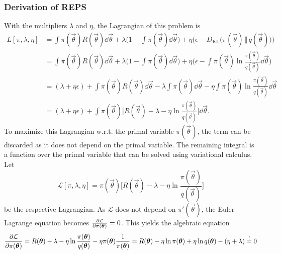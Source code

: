 			\subsubsection{Derivation of REPS}
				With the multipliers \( \lambda \) and \( \eta \), the Lagrangian of this problem is
				\begin{align}
					L[\pi, \lambda, \eta] & =
					\int\! \pi(\vec{\theta}) R(\vec{\theta}) \dd{\vec{\theta}}
					+ \lambda \bigg(\! 1 - \int\! \pi(\vec{\theta}) \dd{\vec{\theta}} \!\!\bigg)
					+ \eta \big( \epsilon - D_\mathrm{KL}\big( \pi(\vec{\theta}) \,\Vert\, q(\vec{\theta}) \big) \big)  \nonumber                             \\
					                      & =
					\int\! \pi(\vec{\theta}) R(\vec{\theta}) \dd{\vec{\theta}}
					+ \lambda \bigg(\! 1 - \int\! \pi(\vec{\theta}) \dd{\vec{\theta}} \!\!\bigg)
					+ \eta \bigg(\! \epsilon - \int\! \pi(\vec{\theta}) \ln \frac{\pi(\vec{\theta})}{q(\vec{\theta})} \dd{\vec{\theta}} \!\!\bigg)  \nonumber \\
					                      & = (\lambda + \eta \epsilon)
					+ \int\! \pi(\vec{\theta}) R(\vec{\theta}) \dd{\vec{\theta}}
					- \lambda \int\! \pi(\vec{\theta}) \dd{\vec{\theta}}
					- \eta \int\! \pi(\vec{\theta}) \ln \frac{\pi(\vec{\theta})}{q(\vec{\theta})} \dd{\vec{\theta}}  \label{eq:repsLagrangian}                \\
					                      & = (\lambda + \eta\epsilon)
					+ \int\! \pi(\vec{\theta}) \bigg[ R(\vec{\theta}) - \lambda - \eta \ln \frac{\pi(\vec{\theta})}{q(\vec{\theta})} \bigg] \dd{\vec{\theta}}.  \nonumber
				\end{align}
				To maximize this Lagrangian w.r.t. the primal variable \( \pi(\vec{\theta}) \), the term can be discarded as it does not depend on the primal variable. The remaining integral is a function over the primal variable that can be solved using variational calculus. Let
				\begin{equation*}
					\mathcal{L}[\pi, \lambda, \eta] = \pi(\vec{\theta}) \bigg[ R(\vec{\theta}) - \lambda - \eta \ln \frac{\pi(\vec{\theta})}{q(\vec{\theta})} \bigg]
				\end{equation*}
				be the respective Lagrangian. As \(\mathcal{L}\) does not depend on \( \pi'(\vec{\theta}) \), the Euler-Lagrange equation becomes \( \pdv{\mathcal{L}}{\pi(\bm{\theta})} = 0 \). This yields the algebraic equation
				\begin{equation*}
					\pdv{\mathcal{L}}{\pi(\bm{\theta})}
					= R(\bm{\theta}) - \lambda - \eta \ln \frac{\pi(\bm{\theta})}{q(\bm{\theta})} - \eta \pi(\bm{\theta}) \frac{1}{\pi(\bm{\theta})}
					= R(\bm{\theta}) - \eta \ln \pi(\bm{\theta}) + \eta \ln q(\bm{\theta}) - (\eta + \lambda)
					\overset{!}{=} 0
				\end{equation*}
